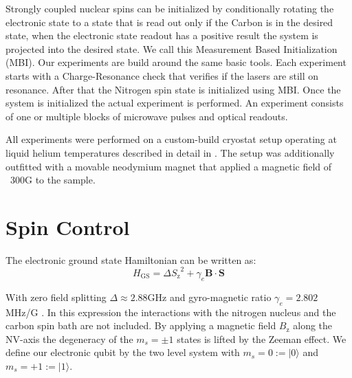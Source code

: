 Strongly coupled nuclear spins can be initialized by conditionally rotating the electronic state to a state that is read out only if the Carbon is in the desired state, when the electronic state readout has a positive result the system is projected into the desired state. We call this Measurement Based Initialization (MBI).
%
%
%
%
%
%
Our experiments are build around the same basic tools.
Each experiment starts with a Charge-Resonance check that verifies if the lasers are still on resonance.
After that the Nitrogen spin state is initialized using MBI.
Once the system is initialized the actual experiment is performed.
An experiment consists of one or multiple blocks of microwave pulses and optical readouts.

All experiments were performed on a custom-build cryostat setup operating at liquid helium temperatures described in detail in \citet[chap.~3]{Bernien2014Control}. The setup was additionally outfitted with a movable neodymium magnet that applied a magnetic field of ~300G to the sample.

\section{Spin Control}
\label{spincontrol}

The electronic ground state Hamiltonian can be written as\citep{Pfaff2013Quantum}: 
 \begin{equation}
H_\mathrm{GS} = \Delta {S_\mathrm{z}}^2 + \gamma_e \mathbf{B} \cdot \mathbf{S}
\end{equation}

With zero field splitting $\Delta \approx 2.88 \mathrm{GHz}$  and gyro-magnetic ratio $\gamma_e  = 2.802$ MHz/G . In this expression the interactions with the nitrogen nucleus and the carbon spin bath are not included. By applying a magnetic field $B_\mathrm{z}$ along the NV-axis the degeneracy of the  $m_s =\pm1$ states is lifted by the Zeeman effect. We define our electronic qubit  by the two level system with  $m_s=0:=|0\rangle$ and $m_s = +1 := |1\rangle$.


